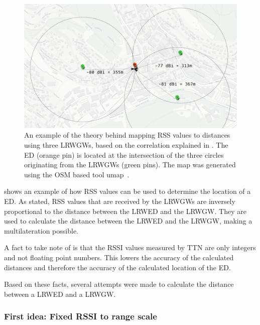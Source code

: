 \begin{figure}[htbp]
    \centering
    \includegraphics[width=1\textwidth]{pictures/multilateration/rssi-multilateration-example.png}
    \caption[Example of the theory behind mapping \acl{RSS} values to distances]{
        An example of the theory behind mapping \ac{RSS} values to distances using three \aclp{LRWGW}, based on the correlation explained in .
        The \acl{ED} (orange pin) is located at the intersection of the three circles originating from the \aclp{LRWGW} (green pins).
        The map was generated using the \ac{OSM} based tool umap~\cite{noauthor_umap_nodate}.
    }\label{fig:rssi-multilateration-theoretical-example}
\end{figure}

 shows an example of how \ac{RSS} values can be used to determine the location of a \acl{ED}.
As stated, \ac{RSS} values that are received by the \aclp{LRWGW} are inversely proportional to the distance between the \acl{LRWED} and the \acl{LRWGW}.
They are used to calculate the distance between the \acl{LRWED} and the \acl{LRWGW}, making a multilateration possible.

A fact to take note of is that the \ac{RSSI} values measured by \ac{TTN} are only integers and not floating point numbers.
This lowers the accuracy of the calculated distances and therefore the accuracy of the calculated location of the \acl{ED}.

Based on these facts, several attempts were made to calculate the distance between a \acl{LRWED} and a \acl{LRWGW}.

\subsubsection{First idea: Fixed \acs{RSSI} to range scale}\label{sec:fixed-rssi-to-range-scale}\label{sec:fixed-rssi-to-range-scale-impl}

